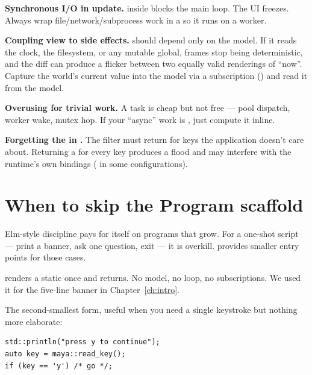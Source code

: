 \begin{warning}
\textbf{Synchronous I/O in update.}  inside
 blocks the main loop. The UI freezes. Always wrap
file/network/subprocess work in a  so it runs on a
worker.
\end{warning}

\begin{warning}
\textbf{Coupling view to side effects.}  should depend
only on the model. If it reads the clock, the filesystem, or any
mutable global, frames stop being deterministic, and the diff can
produce a flicker between two equally valid renderings of ``now''.
Capture the world's current value into the model via a
subscription () and read it from the model.
\end{warning}

\begin{warning}
\textbf{Overusing  for trivial work.} A task is
cheap but not free --- pool dispatch, worker wake, mutex hop. If
your ``async'' work is , just compute it inline.
\end{warning}

\begin{warning}
\textbf{Forgetting the  in .} The
filter must return  for keys the application
doesn't care about. Returning a  for every key produces a
flood and may interfere with the runtime's own bindings (
in some configurations).
\end{warning}

\section{When to skip the Program scaffold}
\label{sec:elm:simple}

Elm-style discipline pays for itself on programs that grow.
For a one-shot script --- print a banner, ask one question, exit ---
it is overkill. \maya{} provides smaller entry points for those
cases.

 renders a static  once and
returns. No model, no loop, no subscriptions. We used it for the
five-line banner in Chapter~\ref{ch:intro}.

The second-smallest form, useful when you need a single keystroke
but nothing more elaborate:

\begin{lstlisting}
std::println("press y to continue");
auto key = maya::read_key();
if (key == 'y') /* go */;
\end{lstlisting}

